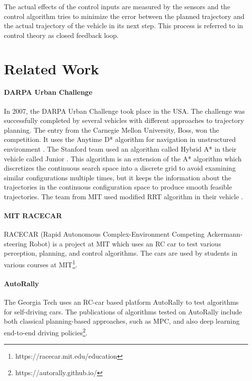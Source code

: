 The actual effects of the control inputs are measured by the sensors and the control algorithm tries to minimize the error between the planned trajectory and the actual trajectory of the vehicle in its next step. This process is referred to in control theory as closed feedback loop.

\section{Related Work}

\paragraph{DARPA Urban Challenge} In 2007, the DARPA Urban Challenge took place in the USA. The challenge was successfully completed by several vehicles with different approaches to trajectory planning. The entry from the Carnegie Mellon University, Boss, won the competition. It uses the Anytime D* algorithm for navigation in unstructured environment \cite{Boss}. The Stanford team used an algorithm called Hybrid A* in their vehicle called Junior \cite{Junior}. This algorithm is an extension of the A* algorithm which discretizes the continuous search space into a discrete grid to avoid examining similar configurations multiple times, but it keeps the information about the trajectories in the continuous configuration space to produce smooth feasible trajectories. The team from MIT used modified RRT algorithm in their vehicle \cite{RRT_urban_driving}.

\paragraph{MIT RACECAR} RACECAR (Rapid Autonomous Complex-Environment Competing Ackermann-steering Robot) is a project at MIT which uses an RC car to test various perception, planning, and control algorithms. The cars are used by students in various courses at MIT\footnote{https://racecar.mit.edu/education}.

\paragraph{AutoRally} The Georgia Tech uses an RC-car based platform AutoRally to test algorithms for self-driving cars. The publications of algorithms tested on AutoRally include both classical planning-based approaches, such as MPC, and also deep learning end-to-end driving policies\footnote{https://autorally.github.io/}.

